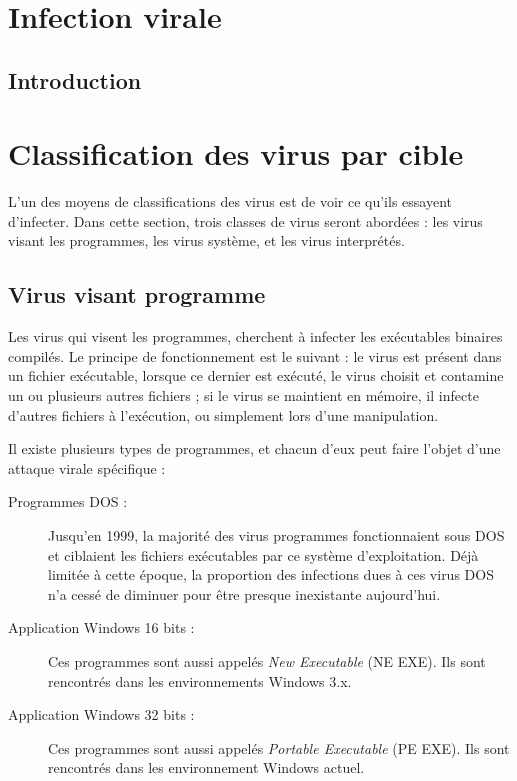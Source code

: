 
\section{Infection virale}
    \subsection{Introduction}

\section{Classification des virus par cible}
L'un des moyens de classifications des virus est de voir ce qu'ils essayent d'infecter.
Dans cette section, trois classes de virus seront abordées : les virus visant les programmes, les virus système,
et les virus interprétés.

    \subsection{Virus visant programme}
    Les virus qui visent les programmes, cherchent à infecter les exécutables binaires compilés. 
    Le principe de fonctionnement est le suivant : le virus est présent dans un fichier exécutable, lorsque 
    ce dernier est exécuté, le virus choisit et contamine un ou plusieurs autres fichiers ; si le virus se maintient
    en mémoire, il infecte d'autres fichiers à l'exécution, ou simplement lors d'une manipulation. %

    Il existe plusieurs types de programmes, et chacun d'eux peut faire l'objet d'une attaque virale spécifique :
    \begin{description}
        \item[Programmes DOS :] Jusqu’en 1999, la majorité des virus programmes fonctionnaient sous 
            DOS et ciblaient les fichiers exécutables par ce système d'exploitation. 
            Déjà limitée à cette époque, la proportion des infections dues à ces virus DOS n’a cessé 
            de diminuer pour être presque inexistante aujourd’hui.
        \item[Application Windows 16 bits :] Ces programmes sont aussi appelés \emph{New Executable} (NE EXE).
            Ils sont rencontrés dans les environnements Windows 3.x. 
        \item[Application Windows 32 bits :] Ces programmes sont aussi appelés \emph{Portable Executable}
            (PE EXE). Ils sont rencontrés dans les environnement Windows actuel.
    \end{description}


